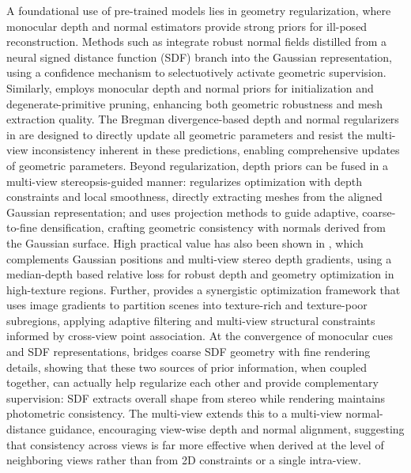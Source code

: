 \documentclass[11pt,a4paper]{article}
\begin{document}
A foundational use of pre-trained models lies in geometry regularization, where monocular depth and normal estimators provide strong priors for ill-posed reconstruction. Methods such as \cite{arxiv:2509.12742v4} integrate robust normal fields distilled from a neural signed distance function (SDF) branch into the Gaussian representation, using a confidence mechanism to selectuotively activate geometric supervision. Similarly, \cite{arxiv:2605.00569v1} employs monocular depth and normal priors for initialization and degenerate-primitive pruning, enhancing both geometric robustness and mesh extraction quality. The Bregman divergence-based depth and normal regularizers in \cite{arxiv:2406.05774v1} are designed to directly update all geometric parameters and resist the multi-view inconsistency inherent in these predictions, enabling comprehensive updates of geometric parameters. Beyond regularization, depth priors can be fused in a multi-view stereopsis-guided manner: \cite{arxiv:2403.17822v1} regularizes optimization with depth constraints and local smoothness, directly extracting meshes from the aligned Gaussian representation; and \cite{arxiv:2407.11840v1} uses projection methods to guide adaptive, coarse-to-fine densification, crafting geometric consistency with normals derived from the Gaussian surface. High practical value has also been shown in \cite{arxiv:2506.13508v1}, which complements Gaussian positions and multi-view stereo depth gradients, using a median-depth based relative loss for robust depth and geometry optimization in high-texture regions. Further, \cite{arxiv:2602.12796v1} provides a synergistic optimization framework that uses image gradients to partition scenes into texture-rich and texture-poor subregions, applying adaptive filtering and multi-view structural constraints informed by cross-view point association. At the convergence of monocular cues and SDF representations, \cite{arxiv:2507.15602v2} bridges coarse SDF geometry with fine rendering details, showing that these two sources of prior information, when coupled together, can actually help regularize each other and provide complementary supervision: SDF extracts overall shape from stereo while rendering maintains photometric consistency. The multi-view \cite{arxiv:2508.07701v2} extends this to a multi-view normal-distance guidance, encouraging view-wise depth and normal alignment, suggesting that consistency across views is far more effective when derived at the level of neighboring views rather than from 2D constraints or a single intra-view.
\end{document}
